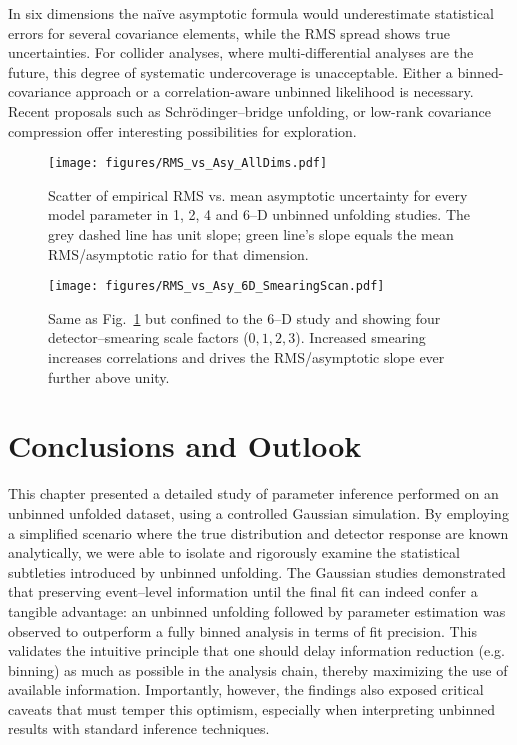             In six dimensions the naïve asymptotic formula would underestimate statistical errors for several covariance elements, while the RMS spread shows true uncertainties.
            For collider analyses, where multi-differential analyses are the future, this degree of systematic undercoverage is unacceptable.
            Either a binned-covariance approach  or a correlation-aware unbinned likelihood is necessary.
            Recent proposals such as Schrödinger--bridge unfolding, or low-rank covariance compression offer interesting possibilities for exploration.
            \begin{figure}
                \centering
                \texttt{[image: figures/RMS\_vs\_Asy\_AllDims.pdf]}
                \caption{Scatter of empirical RMS vs. mean asymptotic uncertainty for every model parameter in 1, 2, 4 and 6--D unbinned unfolding studies.
                The grey dashed line has unit slope; green line's slope equals the mean RMS/asymptotic ratio for that dimension.
                }
                \label{fig:rms-asy-dim}
            \end{figure}

            \begin{figure}[htbp]
                    \centering
                  \texttt{[image: figures/RMS\_vs\_Asy\_6D\_SmearingScan.pdf]}
                  \caption{Same as Fig.~\ref{fig:rms-asy-dim} but confined to the 6--D
                  study and showing four detector–smearing scale factors
                  ($0,1,2,3$).
                  Increased smearing increases correlations and drives the
                  RMS/asymptotic slope ever further above unity.
                  }
                  \label{fig:rms-asy-6D-res}
            \end{figure}
\section{Conclusions and Outlook}
    This chapter presented a detailed study of parameter inference performed on an unbinned unfolded dataset, using a controlled Gaussian simulation.
    By employing a simplified scenario where the true distribution and detector response are known analytically, we were able to isolate and rigorously examine the statistical subtleties introduced by unbinned unfolding.
    The Gaussian studies demonstrated that preserving event--level information until the final fit can indeed confer a tangible advantage: an unbinned unfolding followed by parameter estimation was observed to outperform a fully binned analysis in terms of fit precision.
    This validates the intuitive principle that one should delay information reduction (e.g. binning) as much as possible in the analysis chain, thereby maximizing the use of available information.
    Importantly, however, the findings also exposed critical caveats that must temper this optimism, especially when interpreting unbinned results with standard inference techniques.

